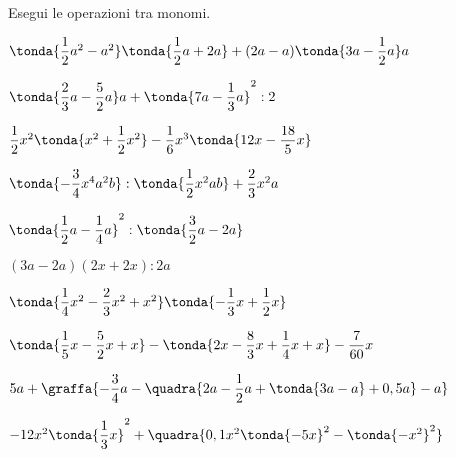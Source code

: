 \begin{esercizio}[*]
\label{ese:9.33}
Esegui le operazioni tra monomi.

\begin{enumeratea}
\spazielenx
\item 
\(\tonda{\dfrac{1}{2}a^{2}-a^{2}}\tonda{\dfrac{1}{2}a+2a}+
(2a-a)\tonda{3a-\dfrac{1}{2}a}a\)
\item 
\(\tonda{\dfrac{2}{3}a-\dfrac{5}{2}a}a+\tonda{7a-\dfrac{1}{3}a}^{2}:2\)
\item 
\(\dfrac{1}{2}x^{2}\tonda{x^{2}+\dfrac{1}{2}x^{2}}-\dfrac{1}{6}x^{3}
\tonda{12x-\dfrac{18}{5}x}\)
\item 
\(\tonda{-{\dfrac{3}{4}}x^{4}a^{2}b}:\tonda{\dfrac{1}{2}x^{2}ab}+
\dfrac{2}{3}x^{2}a\)
\item 
\(\tonda{\dfrac{1}{2}a-\dfrac{1}{4}a}^{2}:\tonda{\dfrac{3}{2}a-2a}\)
\item 
\((3a-2a)(2x+2x):2a\)
\item 
\(\tonda{\dfrac{1}{4}x^{2}-\dfrac{2}{3}x^{2}+x^{2}}
\tonda{-{\dfrac{1}{3}}x+\dfrac{1}{2}x}\)
\item 
\(\tonda{\dfrac{1}{5}x-\dfrac{5}{2}x+x}-
\tonda{2x-\dfrac{8}{3}x+\dfrac{1}{4}x+x}-\dfrac{7}{60}x\)
\item 
\(5a+\graffa{-{\dfrac{3}{4}}a-
\quadra{2a-\dfrac{1}{2}a+\tonda{3a-a}+0,5a}-a}\)
\item 
\(-12x^{2}\tonda{\dfrac{1}{3}x}^{2}+
\quadra{0,1x^{2}\tonda{-5x}^{2}-\tonda{- x^{2}}^{2}}\)
% 
% 
% 
% 
% 
% 
\item 

\end{enumeratea}
\end{esercizio}
